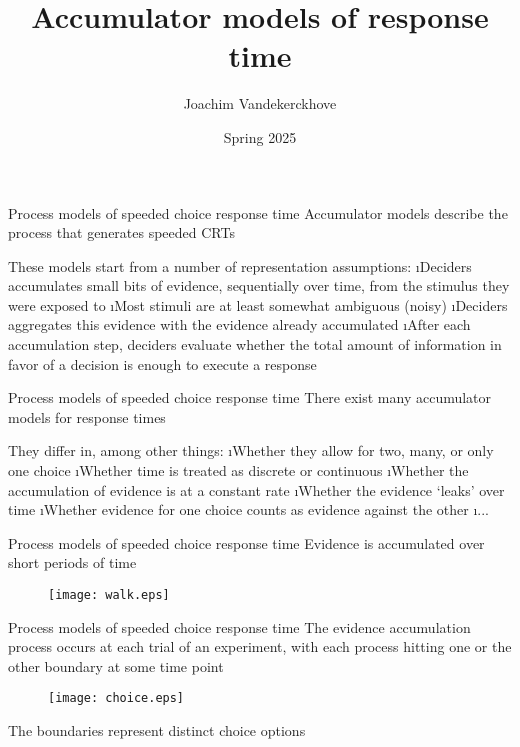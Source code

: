 \documentclass[aspectratio=169]{beamer}
\title{Accumulator models of response time}
\author{Joachim Vandekerckhove}
\date{Spring 2025}
\begin{document}
\maketitle

\begin{frame}[fragile]{Process models of speeded choice response time}
Accumulator models describe the process that generates speeded CRTs\\[2ex]\pause

These models start from a number of representation assumptions:
\bi
\i Deciders accumulates small bits of evidence, sequentially over time, from the stimulus they were exposed to
\i Most stimuli are at least somewhat ambiguous (noisy)
\i Deciders aggregates this evidence with the evidence already accumulated
\i After each accumulation step, deciders evaluate whether the total amount of information in favor of a decision is enough to execute a response
\ei

\end{frame}

\begin{frame}[fragile]{Process models of speeded choice response time}
There exist many accumulator models for response times\\[2ex]\pause

They differ in, among other things:
\bi
\i Whether they allow for two, many, or only one choice
\i Whether time is treated as discrete or continuous
\i Whether the accumulation of evidence is at a constant rate
\i Whether the evidence `leaks' over time
\i Whether evidence for one choice counts as evidence against the other
\i ...
\ei

\end{frame}


\begin{frame}[fragile]{Process models of speeded choice response time}
Evidence is accumulated over short periods of time
\begin{figure}[htp]
\centering
{\texttt{[image: walk.eps]}}
\end{figure}

\end{frame}


\begin{frame}[fragile]{Process models of speeded choice response time}
The evidence accumulation process occurs at each trial of an experiment, with each process hitting one or the other boundary at some time point
\begin{figure}[htp]
\centering
{\texttt{[image: choice.eps]}}
\end{figure}
The boundaries represent distinct choice options
\end{frame}
\end{document}
